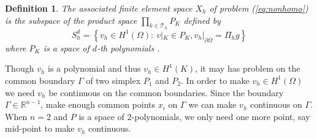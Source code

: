 \documentclass[11pt,letterpaper]{article}
\newtheorem{defn}[thm]{Definition}
\begin{document}

\begin{defn}
  The associated finite element space $X_h$ of problem (\ref{eq:nonhomo})
  is the subspace of the product space $\prod_{k\in \mathscr{T}_h}P_K$
  defined by
  \begin{displaymath}
    S^d_h=\left\{v_h\in H^1(\Omega):\  v|_{K}\in P_K, v_h|_{\partial \Omega}=\Pi_hg
    \right\}
  \end{displaymath}
  where $P_K$ is a space of $d$-th polynomials .
\end{defn}


Though $v_h$ is a polynomial and thus $v_h\in H^1(K)$,
it may has problem on the common boundary $\Gamma$ of
two simplex $P_1$ and $P_2$. In order to make $v_h\in H^1(\Omega)$ we need $v_h$
be continuous on the common boundaries.
Since the boundary $\Gamma\in \mathbb{R}^{n-1}$,
make enough common  points $x_i$ on $\Gamma$ we can make $v_h$ continuous on $\Gamma.$
When $n=2$ and $P$ is a space of 2-polynomials, we only need one more point,
say mid-point to make $v_h$ continuous.
\end{document}
